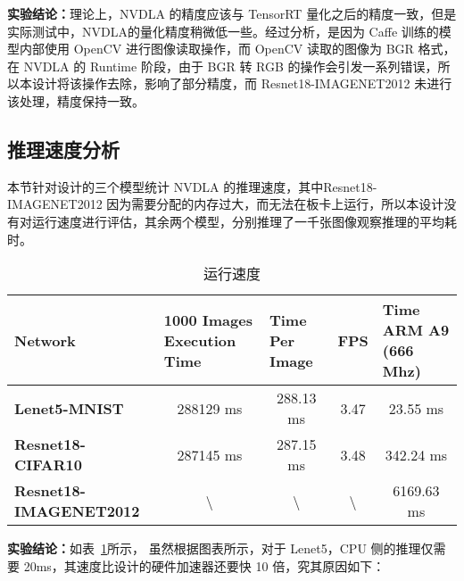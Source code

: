 \textbf{实验结论：}理论上，NVDLA 的精度应该与 TensorRT 量化之后的精度一致，但是实际测试中，NVDLA的量化精度稍微低一些。经过分析，是因为 Caffe 训练的模型内部使用 OpenCV 进行图像读取操作，而 OpenCV 读取的图像为 BGR 格式，在 NVDLA 的 Runtime 阶段，由于 BGR 转 RGB 的操作会引发一系列错误，所以本设计将该操作去除，影响了部分精度，而 Resnet18-IMAGENET2012 未进行该处理，精度保持一致。

\subsection{推理速度分析}

本节针对设计的三个模型统计 NVDLA 的推理速度，其中Resnet18-IMAGENET2012 因为需要分配的内存过大，而无法在板卡上运行，所以本设计没有对运行速度进行评估，其余两个模型，分别推理了一千张图像观察推理的平均耗时。


\begin{table}[!htbp]
    \caption{运行速度}
    \label{tab:Execution Time}
    \centering
    \footnotesize%
    \setlength{\tabcolsep}{4pt}%
    \renewcommand{\arraystretch}{1.2}%
    \begin{tabular}{lcccc}
        \toprule
        \textbf{Network}                                   & \multicolumn{1}{l}{\textbf{1000 Images Execution Time}} & \multicolumn{1}{l}{\textbf{Time Per Image}} & \textbf{FPS}     & \multicolumn{1}{l}{\textbf{Time ARM A9 (666 Mhz)}} \\
        \midrule
        \textbf{Lenet5-MNIST}          & 288129 ms                                               & 288.13 ms                                   & 3.47             & 23.55 ms                                            \\
        \textbf{Resnet18-CIFAR10}      & 287145 ms                                               & 287.15 ms                                   & 3.48             & 342.24 ms                                          \\
        \textbf{Resnet18-IMAGENET2012} & \textbackslash{}                                        & \textbackslash{}                            & \textbackslash{} & 6169.63 ms                                         \\
        \bottomrule                   
    \end{tabular}
\end{table}

\textbf{实验结论：}如表~\ref{tab:Execution Time}所示，
虽然根据图表所示，对于 Lenet5，CPU 侧的推理仅需要 20ms，其速度比设计的硬件加速器还要快 10 倍，究其原因如下：

